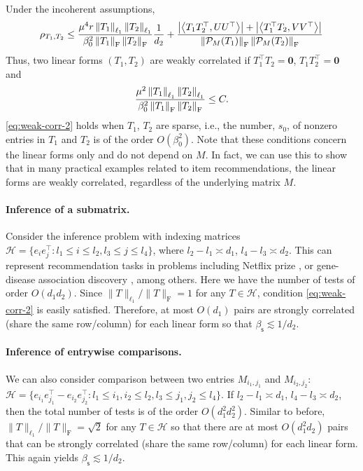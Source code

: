 \documentclass[12pt]{article}
\newcommand{\tF}{{\rm F}}
\newcommand{\abs}[1]{\left\lvert#1\right\rvert}
\newcommand{\norm}[1]{\left\lVert#1\right\rVert}
\newcommand{\cH}{\mathcal{H}}
\newcommand{\cP}{\mathcal{P}}
\def\calH{{\mathcal H}}
\theoremstyle{plain}
\begin{document}
\begin{sloppypar}
Under the incoherent assumptions,
$$
\rho_{T_1,T_2}\le  \frac{ \mu^4 r \norm{T_1}_{\ell_1 }\norm{T_2}_{\ell_1 } }{\beta^2_0 \norm{T_1}_{\tF}\norm{T_2}_{\tF} }\frac{1}{d_2}+\frac{\abs{\left\langle T_1 T_2^\top , UU^\top \right\rangle} +\abs{\left\langle T_1^\top T_2 , VV^\top \right\rangle} }{\norm{\cP_M(T_1)}_\tF \norm{\cP_M(T_2)}_\tF}
$$
Thus, two linear forms $(T_1, T_2)$ are weakly correlated if $T_1^\top T_2=\boldsymbol{0}$, $T_1 T_2^\top=\boldsymbol{0}$ and
\begin{equation}\label{eq:weak-corr-2}
		\frac{ \mu^2 \norm{T_1}_{\ell_1 }\norm{T_2}_{\ell_1 } }{\beta^2_0 \norm{T_1}_{\tF}\norm{T_2}_{\tF} } \le C.
\end{equation}
\eqref{eq:weak-corr-2} holds when $T_1$, $T_2$ are sparse, i.e., the number, $s_0$, of nonzero entries in $T_1$ and $T_2$ is of the order $O(\beta_0^2)$. Note that these conditions concern the linear forms only and do not depend on $M$. In fact, we can use this to show that in many practical examples related to item recommendations, the linear forms are weakly correlated, regardless of the underlying matrix $M$.

\paragraph{Inference of a submatrix.} Consider the inference problem with indexing matrices $\calH=\{e_i e_j^\top : l_1\le i\le l_2, l_3\le j\le l_4  \}$, where $l_2-l_1 \asymp d_1 $, $l_4-l_3 \asymp d_2 $. This can represent recommendation tasks in problems including Netflix prize \citep{bennett2007netflix}, or gene-disease association discovery \citep{natarajan2014inductive}, among others. Here we have the number of tests of order $O(d_1 d_2)$. Since $\|T\|_{\ell_1} /\|T\|_{\mathrm{F}}=1$ for any $T\in \cH$, condition \eqref{eq:weak-corr-2} is easily satisfied. Therefore, at most $O(d_1)$ pairs are strongly correlated (share the same row/column) for each linear form so that $\beta_{\mathsf{s} }\lesssim 1/d_2$.  
	
\paragraph{Inference of entrywise comparisons.} We can also consider comparison between two entries $M_{i_1,j_1}$ and $M_{i_2,j_2}$: $\cH=\{e_{i_1} e_{j_1}^\top- e_{i_2} e_{j_2}^\top: l_1\le i_1,i_2\le l_2, l_3\le j_1,j_2\le l_4  \}$. If $l_2-l_1 \asymp d_1 $, $l_4-l_3 \asymp d_2 $, then the total number of tests is of the order $O(d_1^2 d_2^2)$. Similar to before, $\|T\|_{\ell_1} /\|T\|_{\mathrm{F}}=\sqrt{2}$ for any $T\in \cH$ so that there are at most $O(d_1^2 d_2)$ pairs that can be strongly correlated (share the same row/column) for each linear form. This again yields $\beta_{\mathsf{s} }\lesssim 1/{d_2}$.
	

\end{sloppypar}
\end{document}
